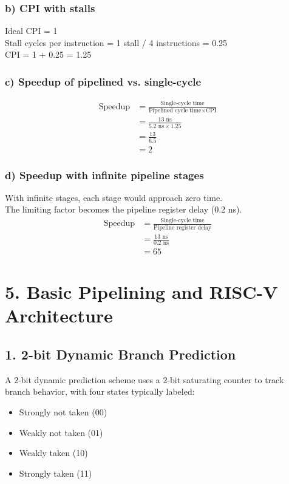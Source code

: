 \documentclass[12pt]{article}
\begin{document}
\subsubsection*{b) CPI with stalls}
Ideal CPI = 1\\
Stall cycles per instruction = 1 stall / 4 instructions = 0.25\\
CPI = 1 + 0.25 = 1.25

\subsubsection*{c) Speedup of pipelined vs. single-cycle}
\begin{align}
\text{Speedup} &= \frac{\text{Single-cycle time}}{\text{Pipelined cycle time} \times \text{CPI}}\\
&= \frac{13 \text{ ns}}{5.2 \text{ ns} \times 1.25}\\
&= \frac{13}{6.5}\\
&= 2
\end{align}

\subsubsection*{d) Speedup with infinite pipeline stages}
With infinite stages, each stage would approach zero time.\\
The limiting factor becomes the pipeline register delay (0.2 ns).
\begin{align}
\text{Speedup} &= \frac{\text{Single-cycle time}}{\text{Pipeline register delay}}\\
&= \frac{13 \text{ ns}}{0.2 \text{ ns}}\\
&= 65
\end{align}

\section*{5. Basic Pipelining and RISC-V Architecture}

\subsection*{1. 2-bit Dynamic Branch Prediction}

A 2-bit dynamic prediction scheme uses a 2-bit saturating counter to track branch behavior, with four states typically labeled:
\begin{itemize}
    \item Strongly not taken (00)
    \item Weakly not taken (01)
    \item Weakly taken (10)
    \item Strongly taken (11)
\end{itemize}
\end{document}

